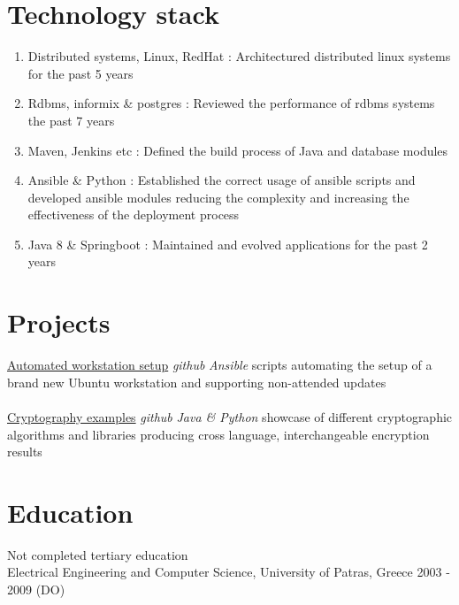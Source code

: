 \documentclass{CVSoftwareEngineer}
\begin{document}

	\begin{paracol}{2}
		\section{Technology stack}
		\begin{enumerate}[labelwidth=!, labelindent=0pt, nosep, leftmargin=*]
			\item[\textasteriskcentered] Distributed systems, Linux, RedHat : Architectured distributed linux systems for the past 5 years
			\item[\textasteriskcentered] Rdbms, informix \& postgres : Reviewed the performance of rdbms systems the past 7 years
			\item[\textasteriskcentered] Maven, Jenkins etc : Defined the build process of Java and database modules
			\item[\textasteriskcentered] Ansible \& Python : Established the correct usage of ansible scripts and developed
				ansible modules reducing the complexity and increasing the
				effectiveness of the deployment process
			\item[\textasteriskcentered] Java 8 \& Springboot : Maintained and evolved applications for the past 2 years
		\end{enumerate}
		\switchcolumn
		\section{Projects}
		\cvProject
			{\href{https://github.com/amolofos/automated-workstation-setup}{Automated workstation setup}}
			{\textit{github}}
			{\textit{Ansible} scripts automating the setup of a brand new Ubuntu
				workstation and supporting non-attended updates}
		\\
		\\
		\cvProject
			{\href{https://github.com/amolofos/cryptography-examples}{Cryptography examples}}
			{\textit{github}}
			{\textit{Java \& Python} showcase of different cryptographic
					algorithms and libraries producing cross language, interchangeable encryption results}
	\end{paracol}

	\section{Education}
	Not completed tertiary education \\
	Electrical Engineering and Computer Science, University of Patras, Greece \hfill {\scriptsize 2003 - 2009 (DO)}
\end{document}
